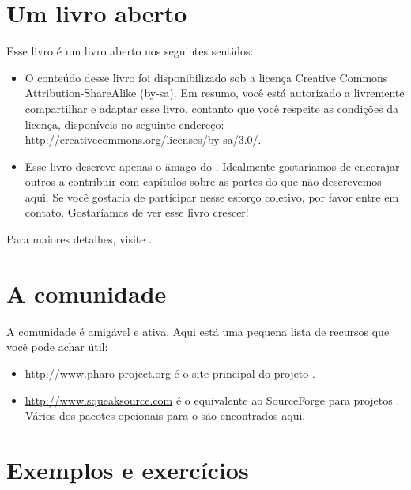 \documentclass[a4paper,10pt,twoside]{book}
\begin{document}
\section*{Um livro aberto}

Esse livro é um livro aberto nos seguintes sentidos:

\begin{itemize}

\item	O conteúdo desse livro foi disponibilizado sob a licença Creative Commons Attribution-ShareAlike (by-sa).
		Em resumo, você está autorizado a livremente compartilhar e adaptar esse livro, contanto que você respeite as condições da licença, disponíveis no seguinte endereço:
		\url{http://creativecommons.org/licenses/by-sa/3.0/}.

\item	Esse livro descreve apenas o âmago do \pharo.
		Idealmente gostaríamos de encorajar outros a contribuir com capítulos
		sobre as partes do \pharo que não descrevemos aqui.
		Se você gostaria de participar nesse esforço coletivo, por favor
		entre em contato.  Gostaríamos de ver esse livro crescer!
\end{itemize}

Para maiores detalhes, visite \pbe.

\section*{A comunidade \pharo}

A comunidade \pharo é amigável e ativa.
Aqui está uma pequena lista de recursos que você pode achar útil:

\begin{itemize}
\item \url{http://www.pharo-project.org} é o site principal do projeto \pharo.

\item \url{http://www.squeaksource.com} é o equivalente ao SourceForge para projetos \pharo.
Vários dos pacotes opcionais para o \pharo são encontrados aqui.
\end{itemize}

\section*{Exemplos e exercícios}
\end{document}
